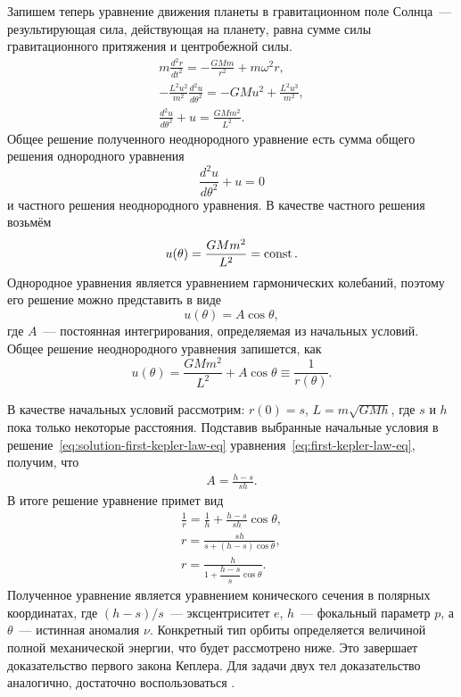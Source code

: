 Запишем теперь уравнение движения планеты в гравитационном поле Солнца~--- результирующая сила, действующая на планету, равна сумме силы гравитационного притяжения и центробежной силы.
\begin{gather}
    m \frac{d^2 r}{d t^2} = - \frac{G M m}{r^2} + m \omega^2 r, \nonumber \\
    - \frac{L^2 u^2}{m^2} \frac{d^2 u}{d \theta^2} = - GMu^2 + \frac{L^2 u^3}{m^2}, \nonumber\\
    \frac{d^2 u}{d \theta^2} + u = \frac{GM m^2}{L^2}. \label{eq:first-kepler-law-eq}
\end{gather}
Общее решение полученного неоднородного уравнение есть сумма общего решения однородного уравнения
\begin{equation*}
    \frac{d^2 u}{d \theta^2} + u = 0
\end{equation*}
и частного решения неоднородного уравнения. В качестве частного решения возьмём
\begin{equation*}
    u(\theta) = \frac{GM m^2}{L^2} = \operatorname{const}.
\end{equation*}
Однородное уравнения является уравнением гармонических колебаний, поэтому его решение можно представить в виде
\begin{equation*}
    u(\theta) = A \cos \theta,
\end{equation*}
где $A$~--- постоянная интегрирования, определяемая из начальных условий. Общее решение неоднородного уравнения запишется, как
\begin{equation}
    u(\theta) = \frac{GM m^2}{L^2} + A \cos \theta \equiv \frac{1}{r(\theta)}.
    \label{eq:solution-first-kepler-law-eq}
\end{equation}

В качестве начальных условий рассмотрим: $r(0) = s$, $L = m\sqrt{G M h}$, где $s$ и $h$ пока только некоторые расстояния. Подставив выбранные начальные условия в решение~\eqref{eq:solution-first-kepler-law-eq} уравнения~\eqref{eq:first-kepler-law-eq}, получим, что
\begin{gather*}
    A = \frac{h - s}{sh}.
\end{gather*}
В итоге решение уравнение примет вид
\begin{gather}
    \frac{1}{r} = \frac{1}{h} + \frac{h - s}{sh} \cos \theta, \nonumber\\
    r = \frac{sh}{s + (h - s) \cos \theta}, \nonumber \\
    r = \frac{h}{1 + \dfrac{h - s}{s} \cos \theta}. 
    \label{eq:first-kepler-law-conic-seq-eq}
\end{gather}
Полученное уравнение является уравнением конического сечения в полярных координатах, где $(h - s)/s$~--- эксцентриситет $e$, $h$~--- фокальный параметр $p$, а $\theta$~--- истинная аномалия $\nu$. Конкретный тип орбиты определяется величиной полной механической энергии, что будет рассмотрено ниже. Это завершает доказательство первого закона Кеплера. Для задачи двух тел доказательство аналогично, достаточно воспользоваться .

